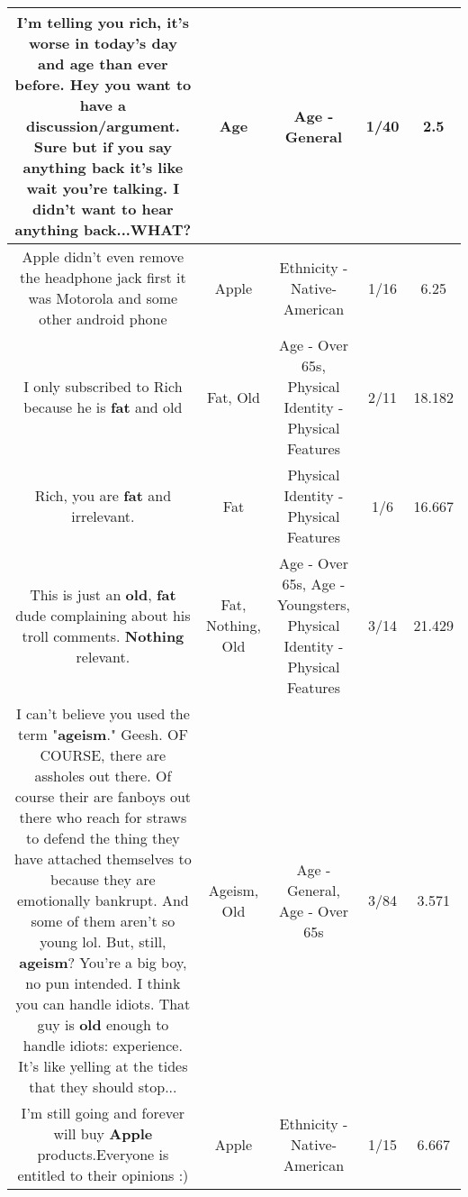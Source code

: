 \documentclass[11pt]{article}
\newlength\mylength
\begin{document}
\begin{center}
\begin{longtable}{|C{.65\mylength}|C{.30\mylength}|C{.12\mylength}|C{.12\mylength}|C{.12\mylength}|}
  \small I'm telling you rich, it's worse in today's day and \textbf{age} than ever before. Hey you want to have a discussion/argument. Sure but if you say anything back it's like wait you're talking. I didn't want to hear anything back...WHAT?\normalsize   & Age & Age - General & 1/40 & 2.5 \\  \hline
  \small Apple didn't even remove the headphone jack first it was Motorola and some other android phone\normalsize   & Apple & Ethnicity - Native-American & 1/16 & 6.25 \\  \hline
  \small I only subscribed to Rich because he is \textbf{fat} and old\normalsize   & Fat, Old & Age - Over 65s, Physical Identity - Physical Features & 2/11 & 18.182 \\  \hline
  \small Rich, you are \textbf{fat} and irrelevant.\normalsize   & Fat & Physical Identity - Physical Features & 1/6 & 16.667 \\  \hline
  \small This is just an \textbf{old}, \textbf{fat} dude complaining about his troll comments. \textbf{Nothing} relevant.\normalsize   & Fat, Nothing, Old & Age - Over 65s, Age - Youngsters, Physical Identity - Physical Features & 3/14 & 21.429 \\  \hline
  \small I can't believe you used the term "\textbf{ageism}." Geesh. OF COURSE, there are assholes out there. Of course their are fanboys out there who reach for straws to defend the thing they have attached themselves to because they are emotionally bankrupt. And some of them aren't so young lol. But, still, \textbf{ageism}? You're a big boy, no pun intended. I think you can handle idiots. That guy is \textbf{old} enough to handle idiots: experience. It's like yelling at the tides that they should stop...\normalsize   & Ageism, Old & Age - General, Age - Over 65s & 3/84 & 3.571 \\  \hline
  \small I'm still going and forever will buy \textbf{Apple} products.Everyone is entitled to their opinions :)\normalsize   & Apple & Ethnicity - Native-American & 1/15 & 6.667 \\  \hline

\end{longtable}
\end{center}
\end{document}
